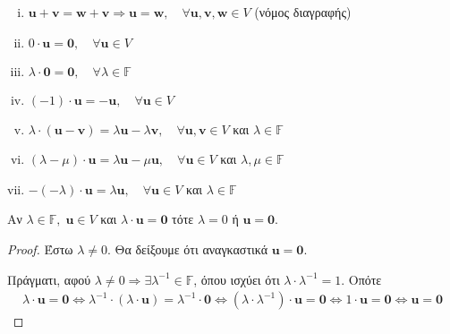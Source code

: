 \documentclass[a4paper,table]{report}
\begin{document}
\begin{thm}
\item {}
  \begin{enumerate}[i)]
    \item $ \mathbf{u} + \mathbf{v} = \mathbf{w} + \mathbf{v} 
      \Rightarrow \mathbf{u} = \mathbf{w}, \quad \forall \mathbf{u}, 
      \mathbf{v}, \mathbf{w} \in V $ \quad (νόμος διαγραφής)
    \item $ 0 \cdot \mathbf{u} = \mathbf{0}, \quad \forall \mathbf{u} \in V $
    \item $ \lambda \cdot \mathbf{0} = \mathbf{0}, \quad \forall \lambda \in 
      \mathbb{F} $
    \item $ (-1)\cdot \mathbf{u} = - \mathbf{u}, \quad \forall \mathbf{u} \in V $ 
    \item $ \lambda \cdot (\mathbf{u} - \mathbf{v}) = 
      \lambda \mathbf{u} - \lambda \mathbf{v}, \quad \forall \mathbf{u}, 
      \mathbf{v} \in V $ και $ \lambda \in \mathbb{F} $
    \item $ (\lambda - \mu ) \cdot \mathbf{u} = \lambda \mathbf{u} - 
      \mu \mathbf{u}, \quad \forall \mathbf{u} \in V $ και $ \lambda, 
      \mu \in \mathbb{F} $
    \item $ -(- \lambda ) \cdot \mathbf{u} = \lambda \mathbf{u}, 
      \quad \forall \mathbf{u} \in V $ και $ \lambda \in \mathbb{F} $
  \end{enumerate}
\end{thm}


\begin{prop} \label{prop:prod}
\item {}
  Αν $ \lambda \in \mathbb{F}, \; \mathbf{u} \in V $ και $ \lambda \cdot \mathbf{u} =
  \mathbf{0} $ τότε $ \lambda = 0 $ ή $ \mathbf{u} = \mathbf{0} $. 
\end{prop}

\begin{proof}
\item {}
  Έστω $ \lambda \neq 0 $. Θα δείξουμε ότι αναγκαστικά $ \mathbf{u} = \mathbf{0} $. 

  Πράγματι, αφού $ \lambda \neq 0 \Rightarrow \exists \lambda ^{-1} \in \mathbb{F} $, 
  όπου ισχύει ότι $ \lambda \cdot \lambda ^{-1} = 1 $. Οπότε 
  \begin{gather*}
    \lambda \cdot \mathbf{u} = \mathbf{0} \Leftrightarrow 
    \lambda ^{-1}\cdot (\lambda \cdot \mathbf{u}) = \lambda ^{-1} \cdot \mathbf{0}
    \Leftrightarrow 
    (\lambda \cdot \lambda ^{-1}) \cdot \mathbf{u} = \mathbf{0} \Leftrightarrow 
    1 \cdot \mathbf{u} = \mathbf{0} \Leftrightarrow 
    \mathbf{u} = \mathbf{0} 
  \end{gather*} 
\end{proof}
\end{document}
